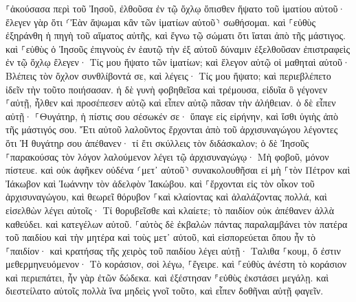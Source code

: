 \documentclass[twoside, 9pt]{extreport}
\begin{document}
⸀ἀκούσασα περὶ τοῦ Ἰησοῦ, ἐλθοῦσα ἐν τῷ ὄχλῳ ὄπισθεν ἥψατο τοῦ ἱματίου αὐτοῦ· 
ἔλεγεν γὰρ ὅτι ⸂Ἐὰν ἅψωμαι κἂν τῶν ἱματίων αὐτοῦ⸃ σωθήσομαι. 
καὶ ⸀εὐθὺς ἐξηράνθη ἡ πηγὴ τοῦ αἵματος αὐτῆς, καὶ ἔγνω τῷ σώματι ὅτι ἴαται ἀπὸ τῆς μάστιγος. 
καὶ ⸀εὐθὺς ὁ Ἰησοῦς ἐπιγνοὺς ἐν ἑαυτῷ τὴν ἐξ αὐτοῦ δύναμιν ἐξελθοῦσαν ἐπιστραφεὶς ἐν τῷ ὄχλῳ ἔλεγεν· Τίς μου ἥψατο τῶν ἱματίων; 
καὶ ἔλεγον αὐτῷ οἱ μαθηταὶ αὐτοῦ· Βλέπεις τὸν ὄχλον συνθλίβοντά σε, καὶ λέγεις· Τίς μου ἥψατο; 
καὶ περιεβλέπετο ἰδεῖν τὴν τοῦτο ποιήσασαν. 
ἡ δὲ γυνὴ φοβηθεῖσα καὶ τρέμουσα, εἰδυῖα ὃ γέγονεν ⸀αὐτῇ, ἦλθεν καὶ προσέπεσεν αὐτῷ καὶ εἶπεν αὐτῷ πᾶσαν τὴν ἀλήθειαν. 
ὁ δὲ εἶπεν αὐτῇ· ⸀Θυγάτηρ, ἡ πίστις σου σέσωκέν σε· ὕπαγε εἰς εἰρήνην, καὶ ἴσθι ὑγιὴς ἀπὸ τῆς μάστιγός σου. 
Ἔτι αὐτοῦ λαλοῦντος ἔρχονται ἀπὸ τοῦ ἀρχισυναγώγου λέγοντες ὅτι Ἡ θυγάτηρ σου ἀπέθανεν· τί ἔτι σκύλλεις τὸν διδάσκαλον; 
ὁ δὲ Ἰησοῦς ⸀παρακούσας τὸν λόγον λαλούμενον λέγει τῷ ἀρχισυναγώγῳ· Μὴ φοβοῦ, μόνον πίστευε. 
καὶ οὐκ ἀφῆκεν οὐδένα ⸂μετ᾽ αὐτοῦ⸃ συνακολουθῆσαι εἰ μὴ ⸀τὸν Πέτρον καὶ Ἰάκωβον καὶ Ἰωάννην τὸν ἀδελφὸν Ἰακώβου. 
καὶ ⸀ἔρχονται εἰς τὸν οἶκον τοῦ ἀρχισυναγώγου, καὶ θεωρεῖ θόρυβον ⸀καὶ κλαίοντας καὶ ἀλαλάζοντας πολλά, 
καὶ εἰσελθὼν λέγει αὐτοῖς· Τί θορυβεῖσθε καὶ κλαίετε; τὸ παιδίον οὐκ ἀπέθανεν ἀλλὰ καθεύδει. 
καὶ κατεγέλων αὐτοῦ. ⸀αὐτὸς δὲ ἐκβαλὼν πάντας παραλαμβάνει τὸν πατέρα τοῦ παιδίου καὶ τὴν μητέρα καὶ τοὺς μετ᾽ αὐτοῦ, καὶ εἰσπορεύεται ὅπου ἦν τὸ ⸀παιδίον· 
καὶ κρατήσας τῆς χειρὸς τοῦ παιδίου λέγει αὐτῇ· Ταλιθα ⸀κουμ, ὅ ἐστιν μεθερμηνευόμενον· Τὸ κοράσιον, σοὶ λέγω, ⸀ἔγειρε. 
καὶ ⸀εὐθὺς ἀνέστη τὸ κοράσιον καὶ περιεπάτει, ἦν γὰρ ἐτῶν δώδεκα. καὶ ἐξέστησαν ⸁εὐθὺς ἐκστάσει μεγάλῃ. 
καὶ διεστείλατο αὐτοῖς πολλὰ ἵνα μηδεὶς γνοῖ τοῦτο, καὶ εἶπεν δοθῆναι αὐτῇ φαγεῖν. 
\end{document}
